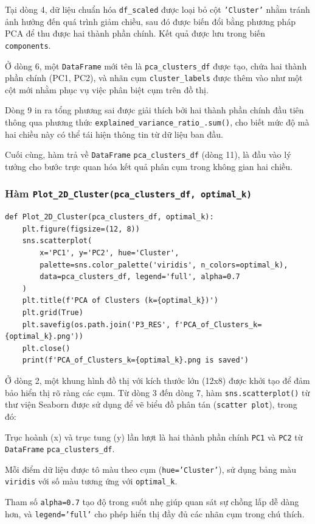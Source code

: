 \documentclass[12pt]{report}
\begin{document}
{Tại dòng 4, dữ liệu chuẩn hóa \texttt{df\_scaled} được loại bỏ cột \texttt{'Cluster'} nhằm tránh ảnh hưởng đến quá trình giảm chiều, sau đó được biến đổi bằng phương pháp PCA để thu được hai thành phần chính. Kết quả được lưu trong biến \texttt{components}.

Ở dòng 6, một \texttt{DataFrame} mới tên là \texttt{pca\_clusters\_df} được tạo, chứa hai thành phần chính (PC1, PC2), và nhãn cụm \texttt{cluster\_labels} được thêm vào như một cột mới nhằm phục vụ việc phân biệt cụm trên đồ thị.

Dòng 9 in ra tổng phương sai được giải thích bởi hai thành phần chính đầu tiên thông qua phương thức \texttt{explained\_variance\_ratio\_.sum()}, cho biết mức độ mà hai chiều này có thể tái hiện thông tin từ dữ liệu ban đầu.

Cuối cùng, hàm trả về \texttt{DataFrame} \texttt{pca\_clusters\_df} (dòng 11), là đầu vào lý tưởng cho bước trực quan hóa kết quả phân cụm trong không gian hai chiều.
\\
\subsubsection{Hàm \texttt{Plot\_2D\_Cluster(pca\_clusters\_df, optimal\_k)}}
\begin{lstlisting}
def Plot_2D_Cluster(pca_clusters_df, optimal_k):
    plt.figure(figsize=(12, 8))
    sns.scatterplot(
        x='PC1', y='PC2', hue='Cluster', 
        palette=sns.color_palette('viridis', n_colors=optimal_k),
        data=pca_clusters_df, legend='full', alpha=0.7
    )
    plt.title(f'PCA of Clusters (k={optimal_k})')
    plt.grid(True)
    plt.savefig(os.path.join('P3_RES', f'PCA_of_Clusters_k={optimal_k}.png'))
    plt.close()
    print(f'PCA_of_Clusters_k={optimal_k}.png is saved')
\end{lstlisting}
Ở dòng 2, một khung hình đồ thị với kích thước lớn (12x8) được khởi tạo để đảm bảo hiển thị rõ ràng các cụm. Từ dòng 3 đến dòng 7, hàm \texttt{sns.scatterplot()} từ thư viện Seaborn được sử dụng để vẽ biểu đồ phân tán (\texttt{scatter plot}), trong đó:

Trục hoành (x) và trục tung (y) lần lượt là hai thành phần chính \texttt{PC1} và \texttt{PC2} từ \texttt{DataFrame} \texttt{pca\_clusters\_df}.

Mỗi điểm dữ liệu được tô màu theo cụm (\texttt{hue='Cluster'}), sử dụng bảng màu \texttt{viridis} với số màu tương ứng với \texttt{optimal\_k}.

Tham số \texttt{alpha=0.7} tạo độ trong suốt nhẹ giúp quan sát sự chồng lấp dễ dàng hơn, và \texttt{legend='full'} cho phép hiển thị đầy đủ các nhãn cụm trong chú thích.

}
\end{document}
